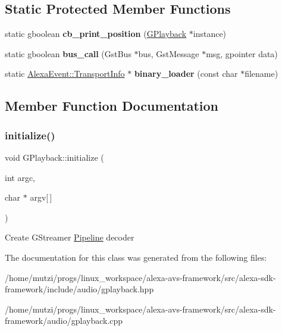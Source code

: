 \subsection*{Static Protected Member Functions}
\begin{DoxyCompactItemize}
\item 
\mbox{\label{classAVS_1_1GPlayback_a539ae06008b59d0e2418cf2fc9be5b31}} 
static gboolean {\bfseries cb\+\_\+print\+\_\+position} (\hyperlink{classAVS_1_1GPlayback}{G\+Playback} $\ast$instance)
\item 
\mbox{\label{classAVS_1_1GPlayback_a875edb4c27fa9fb003fc3dc5ba3c9614}} 
static gboolean {\bfseries bus\+\_\+call} (Gst\+Bus $\ast$bus, Gst\+Message $\ast$msg, gpointer data)
\item 
\mbox{\label{classAVS_1_1GPlayback_a966315c89b4209583df9487ffce84921}} 
static \hyperlink{classAlexaEvent_1_1TransportInfo}{Alexa\+Event\+::\+Transport\+Info} $\ast$ {\bfseries binary\+\_\+loader} (const char $\ast$filename)
\end{DoxyCompactItemize}


\subsection{Member Function Documentation}
\mbox{\label{classAVS_1_1GPlayback_af831308af9bad387a1ac54e187166a0f}} 
\subsubsection{\texorpdfstring{initialize()}{initialize()}}
{\footnotesize\ttfamily void G\+Playback\+::initialize (\begin{DoxyParamCaption}\item[{int}]{argc,  }\item[{char $\ast$}]{argv\mbox{[}$\,$\mbox{]} }\end{DoxyParamCaption})}

Create G\+Streamer \hyperlink{classAVS_1_1Pipeline}{Pipeline} decoder

The documentation for this class was generated from the following files\+:\begin{DoxyCompactItemize}
\item 
/home/mutzi/progs/linux\+\_\+workspace/alexa-\/avs-\/framework/src/alexa-\/sdk-\/framework/include/audio/gplayback.\+hpp\item 
/home/mutzi/progs/linux\+\_\+workspace/alexa-\/avs-\/framework/src/alexa-\/sdk-\/framework/audio/gplayback.\+cpp\end{DoxyCompactItemize}
